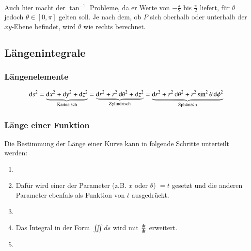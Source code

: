 \\
\begin{minipage}{0.49\linewidth}
    Auch hier macht der $\tan^{-1}$ Probleme, da er Werte von $-\frac{\pi}{2}$ bis $\frac{\pi}{2}$ liefert, für $\theta$ jedoch $\theta \in [0, \pi]$ gelten soll.
    Je nach dem, ob $P$ sich oberhalb oder unterhalb der $xy$-Ebene befindet, wird $\theta$ wie rechts berechnet.
\end{minipage}
\hfill
\begin{minipage}{0.49\linewidth}
    \begin{center}
    \end{center}
\end{minipage}

\subsection{Längenintegrale}
\subsubsection{Längenelemente}\label{section:int_multivar:längenelemente}
$$
 \diff s^2 
    = \underbrace{\diff x^2 + \diff y^2 + \diff z^2}_{\text{Kartesisch}}
    = \underbrace{\diff r^2 + r^2 \diff \theta^2 + \diff z^2}_{\text{Zylindrisch}}
    = \underbrace{\diff r^2 + r^2 \diff \theta^2 + r^2 \sin^2 \theta \diff \phi^2}_{\text{Sphärisch}}
$$
\subsubsection{Länge einer Funktion} \label{section:int_multivar:länge_einer_fkt}
Die Bestimmung der Länge einer Kurve kann in folgende Schritte unterteilt werden:
\begin{enumerate}
    \item {}
    \item[] Dafür wird einer der Parameter (z.B. $x$ oder $\theta$) $=t$ gesetzt und die anderen Parameter ebenfals als Funktion von $t$ ausgedrückt.
    \item {}
    \item[] Das Integral in der Form $ \iiint ds $ wird mit $\frac{\mathop{} \! \mathrm{d} t}{\mathop{} \! \mathrm{d} t}$ erweitert.
    \item {}
\end{enumerate}

